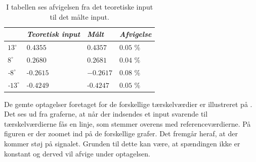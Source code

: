 \begin{table}[H]
\centering
\begin{tabular}{|l|l|l|l|} \cline{2-4} \multicolumn{1}{l|}{}
             & \textit{Teoretisk input} & \textit{Målt} 	& \textit{Afvigelse} \\ \hline
\textit{$13^{\circ}$}  & $0.4355$          & $0.4357$  & $0.05$ \% \\ \hline
\textit{$8^{\circ}$}   & $0.2680$          & $0.2681$  & $0.04$ \% \\ \hline
\textit{-$8^{\circ}$}  & -$0.2615$         & $-0.2617$ & $0.08$ \%  \\ \hline
\textit{-$13^{\circ}$} & -$0.4249$         & -$0.4247$ & $0.05$ \% \\ \hline    
\end{tabular}
\caption{I tabellen ses afvigelsen fra det teoretiske input til det målte input.}
\label{Tab:afvigelse_software}
\end{table}
\noindent De gemte optagelser foretaget for de forskellige tærskelværdier er illustreret på . Det ses ud fra graferne, at når der indsendes et input svarende til tærskelværdierne fås en linje, som stemmer overens med referenceværdierne. På figuren er der zoomet ind på de forskellige grafer. Det fremgår heraf, at der kommer støj på signalet. Grunden til dette kan være, at spændingen ikke er konstant og derved vil afvige under optagelsen. 
